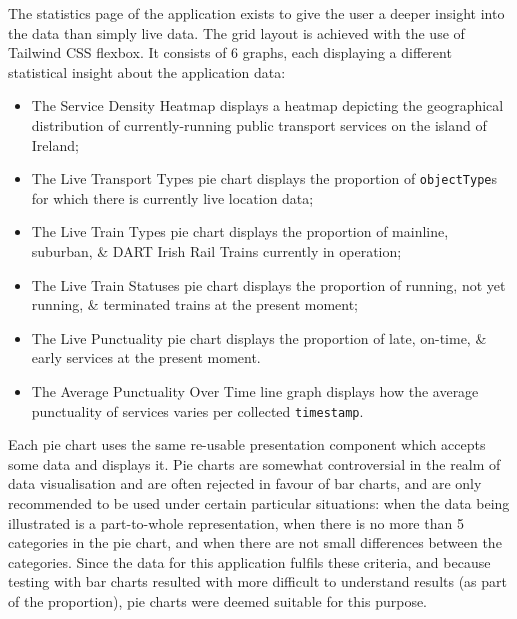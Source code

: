 \documentclass[a4paper,11pt]{report}
\begin{document}
The statistics page of the application exists to give the user a deeper insight into the data than simply live data.
The grid layout is achieved with the use of Tailwind CSS flexbox\supercite{flexbox}.
It consists of 6 graphs, each displaying a different statistical insight about the application data:
\begin{itemize}
  \item   The Service Density Heatmap displays a heatmap depicting the geographical distribution of currently-running public transport services on the island of Ireland;
  \item   The Live Transport Types pie chart displays the proportion of \verb|objectType|s for which there is currently live location data;  
  \item The Live Train Types pie chart displays the proportion of mainline, suburban, \& DART Irish Rail Trains currently in operation;
  \item   The Live Train Statuses pie chart displays the proportion of running, not yet running, \& terminated trains at the present moment;
  \item   The Live Punctuality pie chart displays the proportion of late, on-time, \& early services at the present moment.
  \item   The Average Punctuality Over Time line graph displays how the average punctuality of services varies per collected \verb|timestamp|.
\end{itemize}

Each pie chart uses the same re-usable presentation component which accepts some data and displays it.
Pie charts are somewhat controversial in the realm of data visualisation and are often rejected in favour of bar charts, and are only recommended to be used under certain particular situations:
when the data being illustrated is a part-to-whole representation, when there is no more than 5 categories in the pie chart, and when there are not small differences between the categories\supercite{atlassianpiechart, spotfirepie, inforirver}.
Since the data for this application fulfils these criteria, and because testing with bar charts resulted with more difficult to understand results (as part of the proportion), pie charts were deemed suitable for this purpose.
\end{document}
